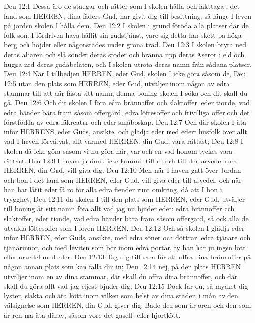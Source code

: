 Deu 12:1  Dessa äro de stadgar och rätter som I skolen hålla och iakttaga i det land som HERREN, dina fäders Gud, har givit dig till besittning; så länge I leven på jorden skolen I hålla dem.
Deu 12:2  I skolen i grund föröda alla platser där de folk som I fördriven hava hållit sin gudstjänst, vare sig detta har skett på höga berg och höjder eller någonstädes under gröna träd.
Deu 12:3  I skolen bryta ned deras altaren och slå sönder deras stoder och bränna upp deras Aseror i eld och hugga ned deras gudabeläten, och I skolen utrota deras namn från sådana platser.
Deu 12:4  När I tillbedjen HERREN, eder Gud, skolen I icke göra såsom de,
Deu 12:5  utan den plats som HERREN, eder Gud, utväljer inom någon av edra stammar till att där fästa sitt namn, denna boning skolen I söka och dit skall du gå.
Deu 12:6  Och dit skolen I föra edra brännoffer och slaktoffer, eder tionde, vad edra händer bära fram såsom offergärd, edra löftesoffer och frivilliga offer och det förstfödda av edra fäkreatur och eder småboskap.
Deu 12:7  Och där skolen I äta inför HERRENS, eder Guds, ansikte, och glädja eder med edert husfolk över allt vad I haven förvärvat, allt varmed HERREN, din Gud, vara rättast;
Deu 12:8  I skolen då icke göra såsom vi nu göra här, var och en vad honom tyckes vara rättast.
Deu 12:9  I haven ju ännu icke kommit till ro och till den arvedel som HERREN, din Gud, vill giva dig.
Deu 12:10  Men när I haven gått över Jordan och bon i det land som HERREN, eder Gud, vill giva eder till arvedel, och när han har låtit eder få ro för alla edra fiender runt omkring, då att I bon i trygghet,
Deu 12:11  då skolen I till den plats som HERREN, eder Gud, utväljer till boning åt sitt namn föra allt vad jag nu bjuder eder: edra brännoffer och slaktoffer, eder tionde, vad edra händer bära fram såsom offergärd, så ock alla de utvalda löftesoffer som I loven HERREN.
Deu 12:12  Och så skolen I glädja eder inför HERREN, eder Guds, ansikte, med edra söner och döttrar, edra tjänare och tjänarinnor, och med leviten som bor inom edra portar, ty han har ju ingen lott eller arvedel med eder.
Deu 12:13  Tag dig till vara för att offra dina brännoffer på någon annan plats som kan falla din in;
Deu 12:14  nej, på den plats HERREN utväljer inom en av dina stammar, där skall du offra dina brännoffer, och där skall du göra allt vad jag eljest bjuder dig.
Deu 12:15  Dock får du, så mycket dig lyster, slakta och äta kött inom vilken som helst av dina städer, i mån av den välsignelse som HERREN, din Gud, giver dig. Både den som är oren och den som är ren må äta därav, såsom vore det gasell- eller hjortkött.
